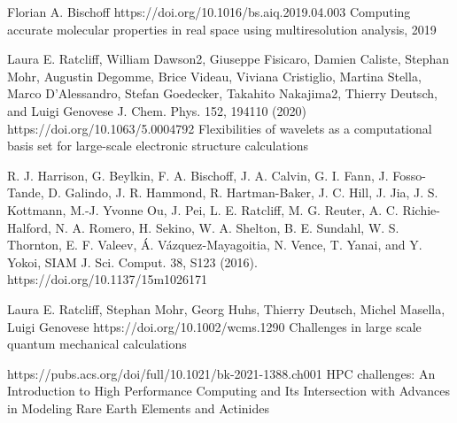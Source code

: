 \documentclass{article}
\begin{document}
\begin{thebibliography}{}


Florian A. Bischoff https://doi.org/10.1016/bs.aiq.2019.04.003  Computing accurate molecular properties in real space using multiresolution analysis,  2019

Laura E. Ratcliff,  William Dawson2, Giuseppe Fisicaro, Damien Caliste, Stephan Mohr, Augustin Degomme, Brice Videau, Viviana Cristiglio, Martina Stella, Marco D’Alessandro, Stefan Goedecker, Takahito Nakajima2, Thierry Deutsch, and Luigi Genovese J. Chem. Phys. 152, 194110 (2020) https://doi.org/10.1063/5.0004792 Flexibilities of wavelets as a computational basis set for large-scale electronic structure calculations

R. J. Harrison, G. Beylkin, F. A. Bischoff, J. A. Calvin, G. I. Fann, J. Fosso-Tande, D. Galindo, J. R. Hammond, R. Hartman-Baker, J. C. Hill, J. Jia, J. S. Kottmann, M.-J. Yvonne Ou, J. Pei, L. E. Ratcliff, M. G. Reuter, A. C. Richie-Halford, N. A. Romero, H. Sekino, W. A. Shelton, B. E. Sundahl, W. S. Thornton, E. F. Valeev, Á. Vázquez-Mayagoitia, N. Vence, T. Yanai, and Y. Yokoi, SIAM J. Sci. Comput. 38, S123 (2016). https://doi.org/10.1137/15m1026171

Laura E. Ratcliff, Stephan Mohr, Georg Huhs, Thierry Deutsch, Michel Masella, Luigi Genovese  https://doi.org/10.1002/wcms.1290 Challenges in large scale quantum mechanical calculations


https://pubs.acs.org/doi/full/10.1021/bk-2021-1388.ch001  HPC challenges: An Introduction to High Performance Computing and Its Intersection with Advances in Modeling Rare Earth Elements and Actinides

\end{thebibliography}
\end{document}
